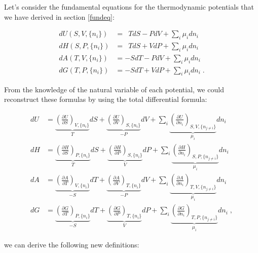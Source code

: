\documentclass[
  9pt,
]{extbook}
\theoremstyle{definition}
\theoremstyle{definition}
\theoremstyle{definition}
\theoremstyle{definition}
\theoremstyle{remark}
\begin{document}
Let's consider the fundamental equations for the thermodynamic potentials that we have derived in section \ref{fundeq}:

\begin{equation}
\begin{aligned}
dU(S,V,\{n_i\}) &= \enspace T dS -P dV + \sum_i \mu_i dn_i \\
dH(S,P,\{n_i\}) &= \enspace T dS + V dP + \sum_i \mu_i dn_i \\
dA(T,V,\{n_i\}) &= -S dT -P dV + \sum_i \mu_i dn_i \\
dG(T,P,\{n_i\}) &= -S dT + V dP + \sum_i \mu_i dn_i\;.
\end{aligned}
\label{eq:dhagchem1}
\end{equation}

From the knowledge of the natural variable of each potential, we could reconstruct these formulas by using the total differential formula:

\begin{equation}
\begin{aligned}
dU &= \underbrace{\left(\frac{\partial U}{\partial S} \right)_{V,\{n_i\}}}_{T} dS + \underbrace{\left(\frac{\partial U}{\partial V} \right)_{S,\{n_i\}}}_{-P} dV + \sum_i \underbrace{\left(\frac{\partial U}{\partial n_i} \right)_{S,V,\{n_{j \neq i}\}}}_{\mu_i} dn_i \\
dH &= \underbrace{\left(\frac{\partial H}{\partial S} \right)_{P,\{n_i\}}}_{T} dS + \underbrace{\left(\frac{\partial H}{\partial P} \right)_{S,\{n_i\}}}_{V} dP + \sum_i \underbrace{\left(\frac{\partial H}{\partial n_i} \right)_{S,P,\{n_{j \neq i}\}}}_{\mu_i} dn_i \\
dA &= \underbrace{\left(\frac{\partial A}{\partial T} \right)_{V,\{n_i\}}}_{-S} dT + \underbrace{\left(\frac{\partial A}{\partial V} \right)_{T,\{n_i\}}}_{-P} dV + \sum_i \underbrace{\left(\frac{\partial A}{\partial n_i} \right)_{T,V,\{n_{j \neq i}\}}}_{\mu_i} dn_i \\
dG &= \underbrace{\left(\frac{\partial G}{\partial T} \right)_{P,\{n_i\}}}_{-S} dT + \underbrace{\left(\frac{\partial G}{\partial P} \right)_{T,\{n_i\}}}_{V} dP + \sum_i \underbrace{\left(\frac{\partial G}{\partial n_i} \right)_{T,P,\{n_{j \neq i}\}}}_{\mu_i} dn_i\;,
\end{aligned}
\label{eq:dhagchem2}
\end{equation}

we can derive the following new definitions:
\end{document}

